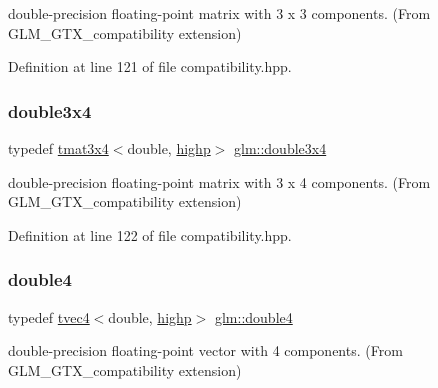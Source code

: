 double-\/precision floating-\/point matrix with 3 x 3 components. (From G\+L\+M\+\_\+\+G\+T\+X\+\_\+compatibility extension) 



Definition at line 121 of file compatibility.\+hpp.

\mbox{\label{group__gtx__compatibility_gaa30d4862bab3c5aa40225105a06b62cc}} 
\subsubsection{\texorpdfstring{double3x4}{double3x4}}
{\footnotesize\ttfamily typedef \mbox{\hyperlink{structglm_1_1tmat3x4}{tmat3x4}}$<$double, \mbox{\hyperlink{namespaceglm_a0f04f086094c747d227af4425893f545ac6f7eab42eacbb10d59a58e95e362074}{highp}}$>$ \mbox{\hyperlink{group__gtx__compatibility_gaa30d4862bab3c5aa40225105a06b62cc}{glm\+::double3x4}}}



double-\/precision floating-\/point matrix with 3 x 4 components. (From G\+L\+M\+\_\+\+G\+T\+X\+\_\+compatibility extension) 



Definition at line 122 of file compatibility.\+hpp.

\mbox{\label{group__gtx__compatibility_ga43d433fc74b24a45801e2be74e7f6fca}} 
\subsubsection{\texorpdfstring{double4}{double4}}
{\footnotesize\ttfamily typedef \mbox{\hyperlink{structglm_1_1tvec4}{tvec4}}$<$double, \mbox{\hyperlink{namespaceglm_a0f04f086094c747d227af4425893f545ac6f7eab42eacbb10d59a58e95e362074}{highp}}$>$ \mbox{\hyperlink{group__gtx__compatibility_ga43d433fc74b24a45801e2be74e7f6fca}{glm\+::double4}}}



double-\/precision floating-\/point vector with 4 components. (From G\+L\+M\+\_\+\+G\+T\+X\+\_\+compatibility extension) 




